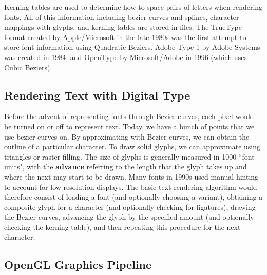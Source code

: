 \documentclass[11pt]{article}
\theoremstyle{plain} %
\theoremstyle{definition}
\theoremstyle{example}
\theoremstyle{remark}
\begin{document}
Kerning tables are used to determine how to space pairs of letters when rendering fonts. All of this information including bezier curves and splines, character mappings with glyphs, and kerning tables are stored in files. The TrueType format created by Apple/Microsoft in the late 1980s was the first attempt to store font information using Quadratic Beziers. Adobe Type 1 by Adobe Systems was created in 1984, and OpenType by Microsoft/Adobe in 1996 (which uses Cubic Beziers). 

\subsection{Rendering Text with Digital Type}

Before the advent of representing fonts through Bezier curves, each pixel would be turned on or off to represent text. Today, we have a bunch of points that we use bezier curves on. By approximating with Bezier curves, we can obtain the outline of a particular character. To draw solid glyphs, we can approximate using triangles or raster filling. The size of glyphs is generally measured in 1000 ``font units", with the \textbf{advance} referring to the length that the glyph takes up and where the next may start to be drawn. Many fonts in 1990s used manual hinting to account for low resolution displays. The basic text rendering algorithm would therefore consist of loading a font (and optionally choosing a variant), obtaining a composite glyph for a character (and optionally checking for ligatures), drawing the Bezier curves, advancing the glyph by the specified amount (and optionally checking the kerning table), and then repeating this procedure for the next character. 

\subsection{OpenGL Graphics Pipeline}
\end{document}
